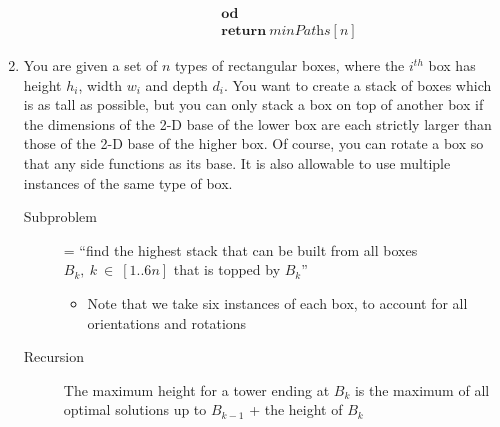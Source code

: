 \documentclass[a4paper]{article}
\begin{document}
\begin{enumerate}
\begin{description}
\begin{align*}
									&\textbf{od} \\
									&\textbf{return}\ \textit{minPaths}[n]
							\end{align*}
			\end{description}
				\clearpage
				\item You are given a set of $n$ types of rectangular boxes, where the $i^{th}$ box has height $h_i$, width $w_i$ and depth $d_i$. You want to create a stack of boxes which is as tall as possible, but you can only stack a box on top of another box if the dimensions of the 2-D base of the lower box are each strictly larger than those of the 2-D base of the higher box. Of course, you can rotate a box so that any side functions as its base. It is also allowable to use multiple instances of the same type of box.
						\begin{description}
								\item[Subproblem] = ``find the highest stack that can be built from all boxes $B_k,\ k\ \in\ [1..6n]$ that is topped by $B_k$'' 
										\begin{itemize}
												\item Note that we take six instances of each box, to account for all orientations and rotations
										\end{itemize}
								\item[Recursion] The maximum height for a tower ending at $B_k$ is the maximum of all optimal solutions up to $B_{k-1}$ + the height of $B_k$


\end{description}
\end{enumerate}
\end{document}
